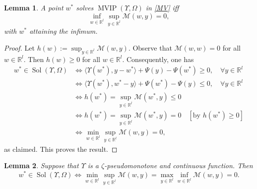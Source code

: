 \documentclass{article}
\theoremstyle{plain}%
\newtheorem{lemma}{Lemma}[section]%
\theoremstyle{thmstyletwo}%
\theoremstyle{thmstylethree}%
\begin{document}
\begin{lemma}\label{lemMOP1}
A point $w^*$ solves $\operatorname{MVIP}(\Upsilon,\Omega)$ in \eqref{MV} iff
\[
\inf_{w \in\mathbb{R}^{l}} \sup_{y\in\mathbb{R}^{l}} \mathcal{M}(w,y)=0,
\]
with $w^*$ attaining the infimum.
\end{lemma}


\begin{proof}
Let $h(w) := \sup_{y \in \mathbb{R}^l} \mathcal{M}(w,y)$. Observe that $\mathcal{M}(w,w) = 0$ for all $w\in \mathbb{R}^l$. Then $h(w) \geq 0$ for all $w\in \mathbb{R}^l$. Consequently, one has
\begin{align*}w^* \in  \operatorname{Sol}(\Upsilon, \Omega) &\Leftrightarrow \langle \Upsilon(w^*), y - w^* \rangle + \Psi(y) - \Psi(w^*) \geq 0, \quad \forall y \in \mathbb{R}^l \\
&\Leftrightarrow \langle \Upsilon(w^*), w^* - y \rangle + \Psi(w^*) - \Psi(y) \leq 0, \quad \forall y \in \mathbb{R}^l \\
&\Leftrightarrow h(w^*) = \sup_{y \in \mathbb{R}^l} \mathcal{M}(w^*, y) \leq 0 \\
&\Leftrightarrow h(w^*) = \sup_{y \in \mathbb{R}^l} \mathcal{M}(w^*, y) = 0 \quad [\text{by } h(w^*) \geq 0] \\
&\Leftrightarrow \min_{w\in \mathbb{R}^l} \sup_{y \in \mathbb{R}^l} \mathcal{M}(w, y) = 0,
\end{align*}
as claimed. This proves the result.
\end{proof}

\begin{lemma}\label{MOPlemm}
Suppose that $\Upsilon$ is a $\zeta$-pseudomonotone and continuous function. Then
\[
w^* \in  \operatorname{Sol}(\Upsilon, \Omega) \Leftrightarrow \min_{w\in \mathbb{R}^l} \sup_{y \in \mathbb{R}^l} \mathcal{M}(w,y) = \max_{y \in \mathbb{R}^l} \inf_{w\in \mathbb{R}^l} \mathcal{M}(w,y) = 0.\]
\end{lemma}
\end{document}
